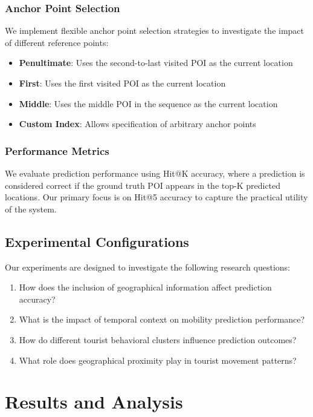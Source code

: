 \documentclass[12pt,a4paper]{article}
\begin{document}
\subsubsection{Anchor Point Selection}
We implement flexible anchor point selection strategies to investigate the impact of different reference points:
\begin{itemize}
\item \textbf{Penultimate}: Uses the second-to-last visited POI as the current location
\item \textbf{First}: Uses the first visited POI as the current location
\item \textbf{Middle}: Uses the middle POI in the sequence as the current location
\item \textbf{Custom Index}: Allows specification of arbitrary anchor points
\end{itemize}

\subsubsection{Performance Metrics}
We evaluate prediction performance using Hit@K accuracy, where a prediction is considered correct if the ground truth POI appears in the top-K predicted locations. Our primary focus is on Hit@5 accuracy to capture the practical utility of the system.

\subsection{Experimental Configurations}

Our experiments are designed to investigate the following research questions:

\begin{enumerate}
\item How does the inclusion of geographical information affect prediction accuracy?
\item What is the impact of temporal context on mobility prediction performance?
\item How do different tourist behavioral clusters influence prediction outcomes?
\item What role does geographical proximity play in tourist movement patterns?
\end{enumerate}

\section{Results and Analysis}
\end{document}
